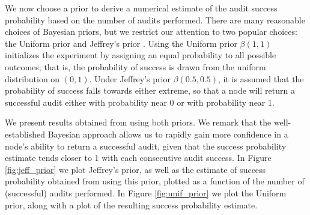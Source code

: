 We now choose a prior to derive a numerical estimate of the audit success probability
based on the number of audits performed.
There are many reasonable choices of Bayesian priors, but we restrict our attention to
two popular choices: the Uniform prior and Jeffrey's prior \cite{jeffrey}.
Using the Uniform prior $\beta(1,1)$ initializes the experiment
by assigning an equal probability to
all possible outcomes;
that is, the probability of success is drawn from the uniform
distribution on $(0,1)$.
Under Jeffrey's prior $\beta(0.5,0.5)$,
it is assumed that the probability of
success falls towards either extreme, so that a node will return a successful audit
either with probability near 0 or with probability near 1.

We present results obtained from using both priors.
We remark that the well-established Bayesian approach
allows us to rapidly gain more confidence
in a node's ability to return a successful audit,
given that the success probability estimate tends closer to 1
with each consecutive audit success. In Figure \ref{fig:jeff_prior} we plot
Jeffrey's prior, as well as the estimate of success probability obtained from using this prior, plotted as a function of the number of (successful) audits performed. In Figure \ref{fig:unif_prior} we plot the Uniform prior, along with a plot of the resulting success probability estimate.

\FloatBarrier
